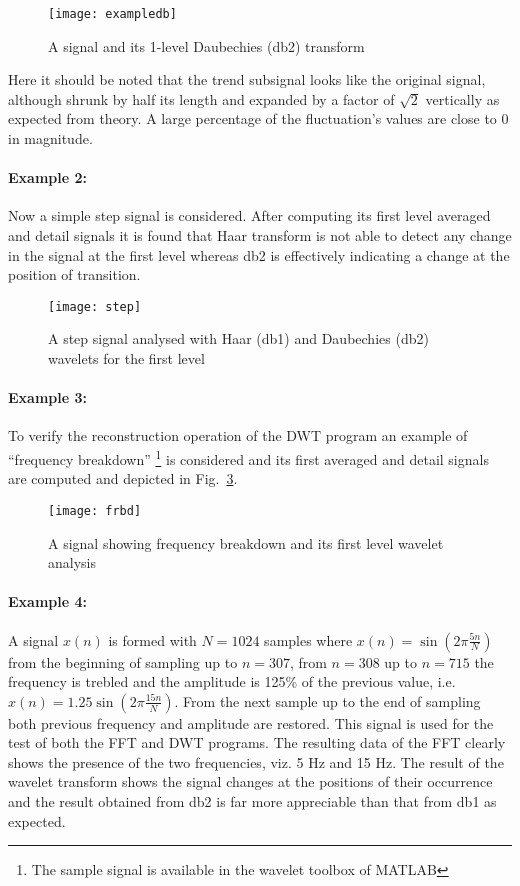 \documentclass[a4paper,11pt]{article}
\begin{document}
\begin{figure}[h]
\centering
\texttt{[image: exampledb]}
\caption{A signal and its 1-level Daubechies (db2) transform} \label{figexampledb}
\end{figure}

Here it should be noted that the trend subsignal looks like the original signal, although shrunk by half its length and expanded by a factor of $\sqrt{2}$ vertically as expected from theory. A large percentage of the fluctuation's values are close to $0$ in magnitude. \cite{walker}

\paragraph{Example 2:} Now a simple step signal is considered. After computing its first level averaged and detail signals it is found that Haar transform is not able to detect any change in the signal at the first level whereas db2 is effectively indicating a change at the position of transition. \cite{waveletug}

\begin{figure}[h]
\centering
\texttt{[image: step]}
\caption{A step signal analysed with Haar (db1) and Daubechies (db2) wavelets for the first level} \label{figstep}
\end{figure}

\clearpage
\paragraph{Example 3:} To verify the reconstruction operation of the DWT program
an example of ``frequency breakdown'' \cite{waveletug}\footnote{The sample signal is available in the wavelet toolbox of MATLAB} is considered and its first averaged and detail signals are computed and depicted in Fig.~\ref{figfrbd}.

\begin{figure}[h]
\centering
\texttt{[image: frbd]}
\caption{A signal showing frequency breakdown and its first level wavelet analysis} \label{figfrbd}
\end{figure}

\clearpage
\paragraph{Example 4:} A signal $x(n)$ is formed with $N=1024$ samples where $x(n)=\sin(2\pi\frac{5n}{N})$ from the beginning of sampling up to $n=307$, from $n=308$ up to $n=715$ the frequency is trebled and the amplitude is 125\% of the previous value, i.e. $x(n)=1.25\sin(2\pi\frac{15n}{N})$. From the next sample up to the end of sampling both previous frequency and amplitude are restored. This signal is used for the test of both the FFT and DWT programs. The resulting data of the FFT clearly shows the presence of the two frequencies, viz. 5 Hz and 15 Hz. The result of the wavelet transform shows the signal changes at the positions of their occurrence and the result obtained from db2 is far more appreciable than that from db1 as expected.
\end{document}
